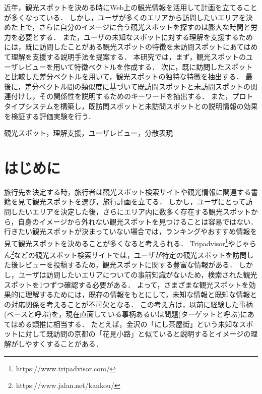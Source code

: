 \documentclass{deimj}
\begin{document}
\pagestyle{empty}
\begin{jabstract}
近年，観光スポットを決める時にWeb上の観光情報を活用して計画を立てることが多くなっている．
しかし，ユーザが多くのエリアから訪問したいエリアを決めた上で，さらに自分のイメージに合う観光スポットを探すのは膨大な時間と労力を必要とする．
また，ユーザの未知なスポットに対する理解を支援するためには，既に訪問したことがある観光スポットの特徴を未訪問スポットにあてはめて理解を支援する説明手法を提案する．
本研究では，まず，観光スポットのユーザレビューを用いて特徴ベクトルを作成する．
次に，既に訪問したスポットと比較した差分ベクトルを用いて，観光スポットの独特な特徴を抽出する．
最後に，差分ベクトル間の類似度に基づいて既訪問スポットと未訪問スポットの関連付けし，その関係性を説明するためのキーワードを抽出する．
また，プロトタイプシステムを構築し，既訪問スポットと未訪問スポットとの説明情報の効果を検証する評価実験を行う．
\end{jabstract}

\begin{jkeyword}
観光スポット，理解支援，ユーザレビュー，分散表現
\end{jkeyword}
\maketitle

\section{はじめに}
\label{sec:はじめに}
旅行先を決定する時，旅行者は観光スポット検索サイトや観光情報に関連する書籍を見て観光スポットを選び，旅行計画を立てる．
しかし，ユーザにとって訪問したいエリアを決定した後，さらにエリア内に数多く存在する観光スポットから，自身のイメージから外れない観光スポットを見つけることは容易ではない．
行きたい観光スポットが決まっていない場合では，ランキングやおすすめ情報を見て観光スポットを決めることが多くなると考えられる．
Tripadvisor\footnote{https://www.tripadvisor.com/}やじゃらん\footnote{https://www.jalan.net/kankou/}などの観光スポット検索サイトでは，ユーザが特定の観光スポットを訪問した後レビューを投稿するため，観光スポットに関する豊富な情報がある．
しかし，ユーザは訪問したいエリアについての事前知識がないため，検索された観光スポットを1つずつ確認する必要がある．
よって，さまざまな観光スポットを効果的に理解するためには，既存の情報をもとにして，未知な情報と既知な情報との対応関係を考えることが不可欠となる．
この考え方は，以前に経験した事柄(ベースと呼ぶ)を，現在直面している事柄あるいは問題(ターゲットと呼ぶ)にあてはめる類推に相当する．
たとえば，金沢の「にし茶屋街」という未知なスポットに対して既訪問の京都の「花見小路」と似ていると説明するとイメージの理解がしやすくすることがある．
\end{document}
